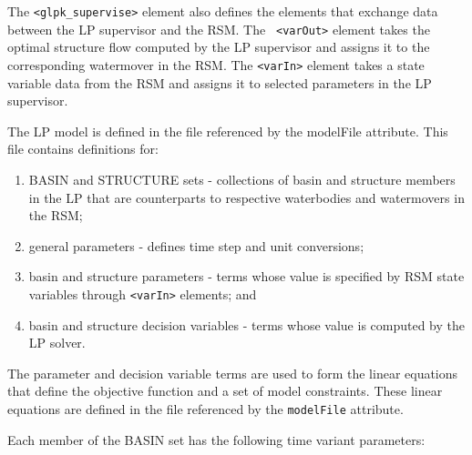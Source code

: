 The {\tt <glpk\_supervise>} element also defines the elements that
exchange data between the LP supervisor and the RSM.  The {\tt
  <varOut>} element takes the optimal structure flow computed by the
LP supervisor and assigns it to the corresponding watermover in the
RSM.  The {\tt <varIn>} element takes a state variable data from the
RSM and assigns it to selected parameters in the LP supervisor.

The LP model is defined in the file referenced by the modelFile
attribute.  This file contains definitions for:
\begin{enumerate}
 
 \item BASIN and STRUCTURE sets \-- collections of basin and structure
   members in the LP that are counterparts to respective waterbodies and
   watermovers in the RSM;

 \item general parameters \-- defines time step and unit conversions;

 \item basin and structure parameters \-- terms whose value is
   specified by RSM state variables through {\tt <varIn>} elements;
   and

 \item basin and structure decision variables \-- terms whose value
   is computed by the LP solver.

\end{enumerate}

The parameter and decision variable terms are used to form the linear
equations that define the objective function and a set of model
constraints.  These linear equations are defined in the file
referenced by the {\tt modelFile} attribute.

Each member of the BASIN set has the following time variant
parameters:

